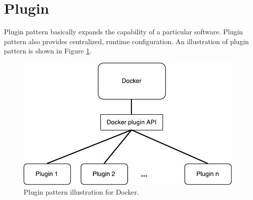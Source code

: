 \section{Plugin}
\label{sec:pattern-plugin}
Plugin pattern basically expands the capability of a particular software. Plugin
pattern also provides centralized, runtime configuration\cite{eaa}. An
illustration of plugin pattern is shown in Figure \ref{fig:plugin-pattern}.

\begin{figure}[H]
\centering
\includegraphics[scale=0.5]{5-patterns/images/plugins-pattern.pdf}
\caption{Plugin pattern illustration for Docker.}
\label{fig:plugin-pattern}
\end{figure}

